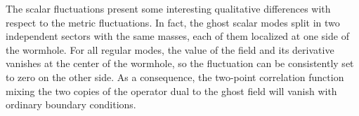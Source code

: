 The scalar fluctuations present some interesting qualitative differences with respect to the metric fluctuations.
In fact, the ghost scalar modes split in two independent sectors with the same masses, each of them localized at one side of the wormhole.
For all regular modes, the value of the field and its derivative vanishes at the center of the wormhole, so the fluctuation can be consistently set to zero on the other side.
As a consequence, the two-point correlation function mixing the two copies of the operator dual to the ghost field will vanish with ordinary boundary conditions.

